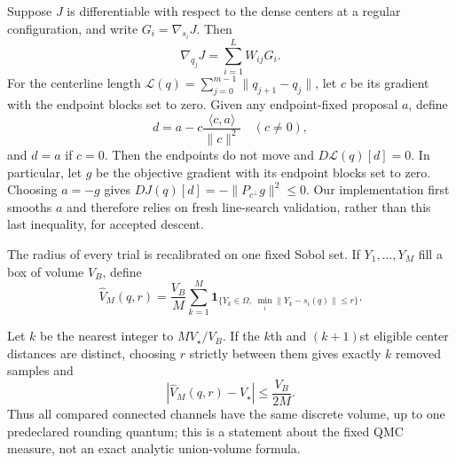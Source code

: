 \begin{proposition}
\label{prop:channel-chainrule}
Suppose $J$ is differentiable with respect to the dense centers at a regular
configuration, and write $G_i=\nabla_{s_i}J$.  Then
\begin{equation}
 \nabla_{q_j}J=\sum_{i=1}^{L}W_{ij}G_i.
 \label{eq:channelchainrule}
\end{equation}
For the centerline length
$\mathcal L(q)=\sum_{j=0}^{m-1}\|q_{j+1}-q_j\|$, let $c$ be its gradient
with the endpoint blocks set to zero.  Given any endpoint-fixed proposal $a$,
define
\begin{equation}
 d=a-c\frac{\langle c,a\rangle}{\|c\|^2}
 \quad(c\ne0),
 \label{eq:lengthprojection}
\end{equation}
and $d=a$ if $c=0$.  Then the endpoints do not move and
$D\mathcal L(q)[d]=0$.  In particular, let $g$ be the objective gradient with
its endpoint blocks set to zero.  Choosing $a=-g$ gives
$DJ(q)[d]=-\|P_{c^\perp}g\|^2\le0$.  Our implementation first
smooths $a$ and therefore relies on fresh line-search validation, rather than
this last inequality, for accepted descent.
\end{proposition}

The radius of every trial is recalibrated on one fixed Sobol set.  If
$Y_1,\ldots,Y_M$ fill a box of volume $V_B$, define
\begin{equation}
 \widehat V_M(q,r)=\frac{V_B}{M}\sum_{k=1}^{M}
 \mathbf 1_{\{Y_k\in\Omega,\;\min_i\|Y_k-s_i(q)\|\le r\}}.
 \label{eq:qmcchannelvolume}
\end{equation}

\begin{proposition}
\label{prop:qmc-volume}
Let $k$ be the nearest integer to $MV_\star/V_B$.  If the $k$th and
$(k+1)$st eligible center distances are distinct, choosing $r$ strictly
between them gives exactly $k$ removed samples and
\begin{equation}
 |\widehat V_M(q,r)-V_\star|\le \frac{V_B}{2M}.
 \label{eq:qmcvolumequantum}
\end{equation}
Thus all compared connected channels have the same discrete volume, up to one
predeclared rounding quantum; this is a statement about the fixed QMC measure,
not an exact analytic union-volume formula.
\end{proposition}

